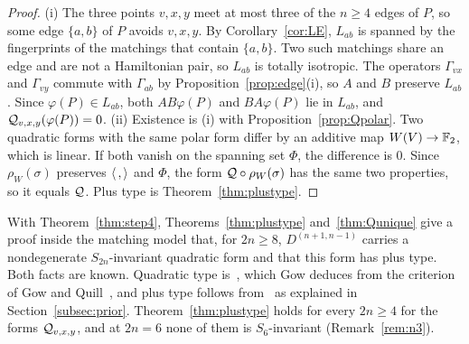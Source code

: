\begin{proof}
(i) The three points $v,x,y$ meet at most three of the $n\ge4$ edges of $P$, so some edge $\{a,b\}$ of $P$ avoids $v,x,y$. By Corollary~\ref{cor:LE}, $L_{ab}$ is spanned by the fingerprints of the matchings that contain $\{a,b\}$. Two such matchings share an edge and are not a Hamiltonian pair, so $L_{ab}$ is totally isotropic. The operators $\Gamma_{vx}$ and $\Gamma_{vy}$ commute with $\Gamma_{ab}$ by Proposition~\ref{prop:edge}(i), so $A$ and $B$ preserve $L_{ab}$. Since $\varphi(P)\in L_{ab}$, both $AB\varphi(P)$ and $BA\varphi(P)$ lie in $L_{ab}$, and $\mathcal{Q}_{v,x,y}(\varphi(P))=0$. (ii) Existence is (i) with Proposition~\ref{prop:Qpolar}. Two quadratic forms with the same polar form differ by an additive map $W(V)\to\mathbb{F}_2$, which is linear. If both vanish on the spanning set $\Phi$, the difference is $0$. Since $\rho_W(\sigma)$ preserves $\langle\,,\rangle$ and $\Phi$, the form $\mathcal{Q}\circ\rho_W(\sigma)$ has the same two properties, so it equals $\mathcal{Q}$. Plus type is Theorem~\ref{thm:plustype}.
\end{proof}

With Theorem~\ref{thm:step4}, Theorems~\ref{thm:plustype} and~\ref{thm:Qunique} give a proof inside the matching model that, for $2n\ge8$, $D^{(n+1,n-1)}$ carries a nondegenerate $S_{2n}$-invariant quadratic form and that this form has plus type. Both facts are known. Quadratic type is~\cite[Lemma~2]{Gow16}, which Gow deduces from the criterion of Gow and Quill~\cite[Thm.~1]{GQ04}, and plus type follows from~\cite[Lemma~3]{Gow16} as explained in Section~\ref{subsec:prior}. Theorem~\ref{thm:plustype} holds for every $2n\ge4$ for the forms $\mathcal{Q}_{v,x,y}$, and at $2n=6$ none of them is $S_6$-invariant (Remark~\ref{rem:n3}).

